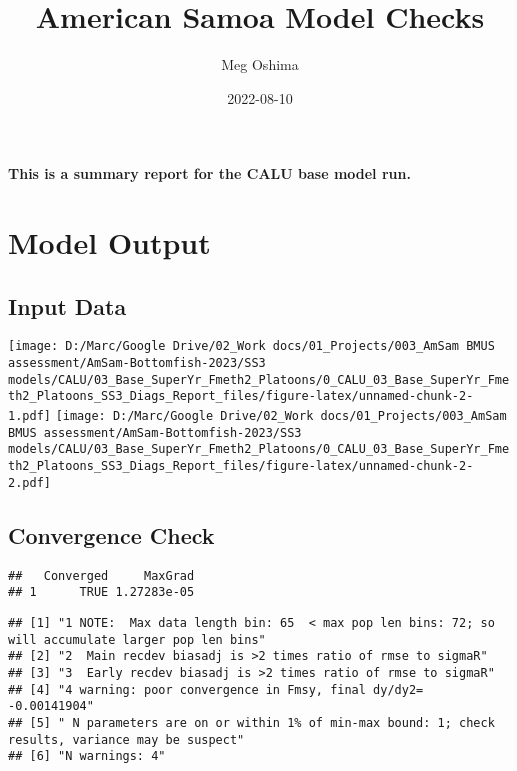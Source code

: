\documentclass[
]{article}
\title{American Samoa Model Checks}
\author{Meg Oshima}
\date{2022-08-10}
\begin{document}
\maketitle

\textbf{This is a summary report for the CALU base model run.}

\hypertarget{model-output}{%
\section{Model Output}\label{model-output}}

\hypertarget{input-data}{%
\subsection{Input Data}\label{input-data}}

\texttt{[image: D:/Marc/Google Drive/02\_Work docs/01\_Projects/003\_AmSam BMUS assessment/AmSam-Bottomfish-2023/SS3 models/CALU/03\_Base\_SuperYr\_Fmeth2\_Platoons/0\_CALU\_03\_Base\_SuperYr\_Fmeth2\_Platoons\_SS3\_Diags\_Report\_files/figure-latex/unnamed-chunk-2-1.pdf]}
\texttt{[image: D:/Marc/Google Drive/02\_Work docs/01\_Projects/003\_AmSam BMUS assessment/AmSam-Bottomfish-2023/SS3 models/CALU/03\_Base\_SuperYr\_Fmeth2\_Platoons/0\_CALU\_03\_Base\_SuperYr\_Fmeth2\_Platoons\_SS3\_Diags\_Report\_files/figure-latex/unnamed-chunk-2-2.pdf]}

\hypertarget{convergence-check}{%
\subsection{Convergence Check}\label{convergence-check}}

\begin{verbatim}
##   Converged     MaxGrad
## 1      TRUE 1.27283e-05
\end{verbatim}

\begin{verbatim}
## [1] "1 NOTE:  Max data length bin: 65  < max pop len bins: 72; so will accumulate larger pop len bins"
## [2] "2  Main recdev biasadj is >2 times ratio of rmse to sigmaR"                                      
## [3] "3  Early recdev biasadj is >2 times ratio of rmse to sigmaR"                                     
## [4] "4 warning: poor convergence in Fmsy, final dy/dy2= -0.00141904"                                  
## [5] " N parameters are on or within 1% of min-max bound: 1; check results, variance may be suspect"   
## [6] "N warnings: 4"
\end{verbatim}
\end{document}
